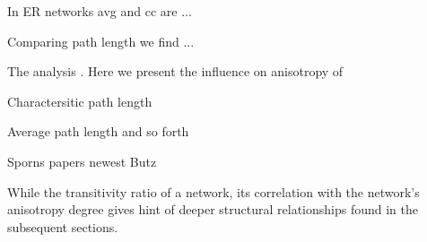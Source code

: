 In ER networks avg and cc are ...


Comparing path length we find ... 

The analysis . Here we present the influence on anisotropy of

Charactersitic path length



Average path length and so forth

Sporns papers   newest Butz

While the transitivity ratio of a network, its correlation with the
network's anisotropy degree gives hint of deeper structural
relationships found in the subsequent sections.



